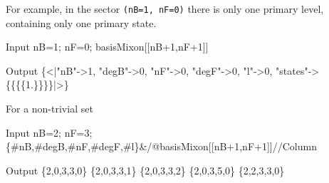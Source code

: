 \documentclass[12pt]{article}
\begin{document}
For example, in the sector {\tt (nB=1, nF=0)} there is only one primary level, containing only one 
primary state.
\begin{mmaCell}[moredefined={basisMixon}]{Input}
  nB=1; nF=0; 
  basisMixon[[nB+1,nF+1]]
\end{mmaCell}
\begin{mmaCell}{Output}
  \{<|"nB"->1, "degB"->0, "nF"->0, "degF"->0, "l"->0, 
  "states"->\{\{\{\{1.\}\}\}\}|>\}
\end{mmaCell}
For a non-trivial set
\begin{mmaCell}[moredefined={basisMixon}]{Input}
  nB=2; nF=3; 
  \{#nB,#degB,#nF,#degF,#l\}&/@basisMixon[[nB+1,nF+1]]//Column
\end{mmaCell}
\begin{mmaCell}{Output}
  \{2,0,3,3,0\}
  \{2,0,3,3,1\}
  \{2,0,3,3,2\}
  \{2,0,3,5,0\}
  \{2,2,3,3,0\}
\end{mmaCell}
\end{document}
